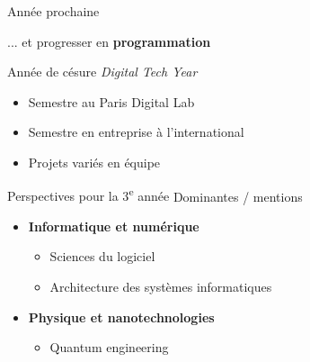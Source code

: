 \begin{frame}{Année prochaine}
  \begin{center}
    ... et progresser en \textbf{programmation}
  \end{center}
  \small{Année de césure \textit{Digital Tech Year}}
  \footnotesize{
  \begin{itemize}
    \item Semestre au Paris Digital Lab
    \item Semestre en entreprise à l'international
    \item Projets variés en équipe
  \end{itemize}
  }
\end{frame}

\begin{frame}{Perspectives pour la 3\textsuperscript{e} année}
Dominantes / mentions
\vspace{.5em}
\begin{itemize}
  \item \textbf{Informatique et numérique}
  \begin{itemize}
      \item Sciences du logiciel
      \item Architecture des systèmes informatiques
  \end{itemize}
  \item \textbf{Physique et nanotechnologies}
  \begin{itemize}
      \item Quantum engineering
  \end{itemize}
\end{itemize}
\end{frame}
